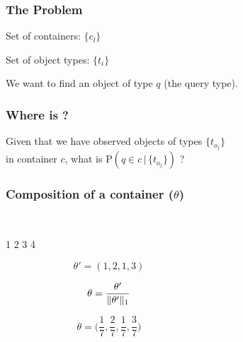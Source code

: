 \begin{frame}
  \frametitle{The Problem}
  \begin{center}
    \vspace{-0.13in}
    Set of containers: $\{c_l\}$


    Set of object types: $\{t_i\}$


    We want to find an object of type $q$ (the query type).


  \end{center}
\end{frame}

\begin{frame}
  \frametitle{Where is ?}
  \begin{center}

    \vspace{0.3in}

    Given that we have observed objects of types $\{t_{o_j}\}$ \\
    in container $c$, what is $\mathrm{P}(q \in c \, | \, \{t_{o_j}\})$ ?
  \end{center}
\end{frame}

\begin{frame}
  \frametitle{Composition of a container ($\theta$)}
  \begin{columns}
    \begin{column}{0.7\textwidth}
      \begin{center}
        \\
        \hspace{0.1in} 1 \hspace{0.2in} 2 \hspace{0.08in} 3 \hspace{0.08in} 4

        \begin{equation*}
          \theta' = (1, 2, 1, 3)
        \end{equation*}

        \begin{equation*}
          \theta = \frac{\theta'}{\norm{1}{\theta'}}
        \end{equation*}

        \begin{equation*}
          \theta = \Big ( \frac17, \frac27, \frac17, \frac37 \Big )
        \end{equation*}
      \end{center}
    \end{column}
    \begin{column}{0.3\textwidth}
    \end{column}
  \end{columns}
\end{frame}
